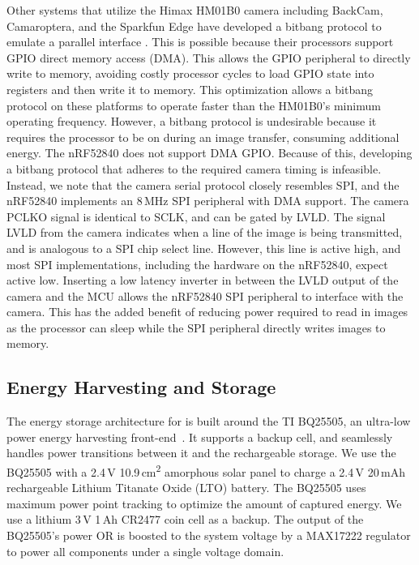 Other systems that utilize the Himax HM01B0 camera including BackCam, Camaroptera, and the Sparkfun Edge have developed a bitbang protocol to emulate a parallel interface \cite{josephson2019wireless, nardello2019camaroptera, sparkfunedge}. This is possible because their processors support GPIO direct memory access (DMA). This allows the GPIO peripheral to directly write to memory, avoiding costly processor cycles to load GPIO state into registers and then write it to memory. This optimization allows a bitbang protocol on these platforms to operate faster than the HM01B0's minimum operating frequency. However, a bitbang protocol is undesirable because it requires the processor to be on during an image transfer, consuming additional energy. The nRF52840 does not support DMA GPIO. Because of this, developing a bitbang protocol that adheres to the required camera timing is infeasible. Instead, we note that the camera serial protocol closely resembles SPI, and the nRF52840 implements an 8\,MHz SPI peripheral with DMA support. The camera PCLKO signal is identical to SCLK, and can be gated by LVLD. The signal LVLD from the camera indicates when a line of the image is being transmitted, and is analogous to a SPI chip select line. However, this line is active high, and most SPI implementations, including the hardware on the nRF52840, expect active low. Inserting a low latency inverter in between the LVLD output of the camera and the MCU allows the nRF52840 SPI peripheral to interface with the camera. This has the added benefit of reducing power required to read in images as the processor can sleep while the SPI peripheral directly writes images to memory.

\subsection{Energy Harvesting and Storage}
The energy storage architecture for \name{} is built around the TI BQ25505, an ultra-low power energy harvesting front-end~\cite{bq25505}. It supports a backup cell, and seamlessly handles power transitions between it and the rechargeable storage. We use the BQ25505 with a 2.4\,V 10.9\,cm\textsuperscript{2} amorphous solar panel to charge a 2.4\,V 20\,mAh rechargeable Lithium Titanate Oxide (LTO) battery. The BQ25505 uses maximum power point tracking to optimize the amount of captured energy. We use a lithium 3\,V 1\,Ah CR2477 coin cell as a backup. The output of the BQ25505's power OR is boosted to the system voltage by a MAX17222 regulator to power all components under a single voltage domain.

